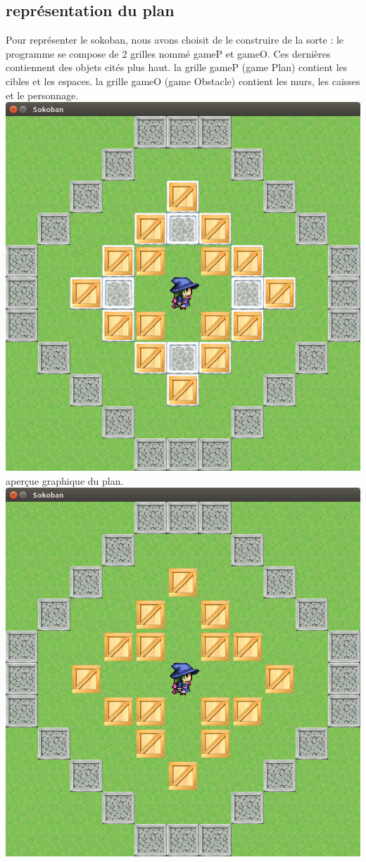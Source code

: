 \documentclass{article}
\begin{document}
	\subsection{représentation du plan}
	Pour représenter le sokoban, nous avons choisit de le construire de la sorte : le programme se compose de 2 grilles nommé gameP 
	et gameO. Ces dernières contiennent des objets cités plus haut.
	\newline
	la grille gameP (game Plan) contient les cibles et les espaces. la grille gameO (game Obstacle) contient les murs, les caisses et le personnage.
	\newline
	\includegraphics[scale=0.25]{05.png}
	\newline
	aperçue graphique du plan.
	\newline
	\includegraphics[scale=0.25]{06.png}
\end{document}
